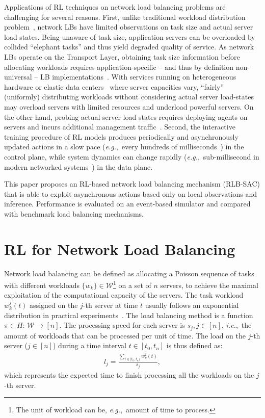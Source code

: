 \documentclass{article}
\newcommand{\ie}{\textit{i.e.},\ }
\newcommand{\eg}{\textit{e.g.},\ }
\begin{document}
Applications of RL techniques on network load balancing problems are challenging for several reasons.
First, unlike traditional workload distribution problem~\cite{auto2018sigcomm, decima2018}, network LBs have limited observations on task size and actual server load states.
Being unaware of task size, application servers can be overloaded by collided ``elephant tasks'' and thus yield degraded quality of service.
As network LBs operate on the Transport Layer, obtaining task size information before allocating workloads requires application-specific -- and thus by definition non-universal -- LB implementations~\cite{haproxy2012, nginx2008}.
With services running on heterogeneous hardware or elastic data centers~\cite{kumar2020fast} where server capacities vary, ``fairly'' (uniformly) distributing workloads without considering actual server load-states may overload servers with limited resources and underload powerful servers.
On the other hand, probing actual server load states requires deploying agents on servers and incurs additional management traffic~\cite{6lb, incab2018}.
Second, the interactive training procedure of RL models produces periodically and asynchronously updated actions in a slow pace (\eg every hundreds of milliseconds~\cite{sivakumar2019mvfst}) in the control plane, while system dynamics can change rapidly (\eg sub-millisecond in modern networked systems~\cite{guo2015pingmesh}) in the data plane.

This paper proposes an RL-based network load balancing mechanism (RLB-SAC) that is able to exploit asynchronous actions based only on local observations and inference.
Performance is evaluated on an event-based simulator and compared with benchmark load balancing mechanisms.


\section{RL for Network Load Balancing}

Network load balancing can be defined as allocating a Poisson sequence of tasks with different workloads $\{w_k\}\in\mathcal{W}$\footnote{The unit of workload can be, \eg amount of time to process.} on a set of $n$ servers, to achieve the maximal exploitation of the computational capacity of the servers.
The task workload $w^j_k(t)$ assigned on the $j$-th server at time $t$ usually follows an exponential distribution in practical experiments~\cite{facebook-dc-traffic}. 
The load balancing method is a function $\pi\in\Pi$: $\mathcal{W}\rightarrow [n]$. 
The processing speed for each server is $s_j, j\in[n]$, \ie the amount of workloads that can be processed per unit of time. 
The load on the $j$-th server ($j\in[n]$) during a time interval $t\in[t_0, t_n]$ is thus defined as: 
\begin{align}
    l_j=\frac{\sum_{t\in[t_0, t_n)}w^j_k(t)}{s_j},
\end{align}
which represents the expected time to finish processing all the workloads on the $j$-th server.
\end{document}
